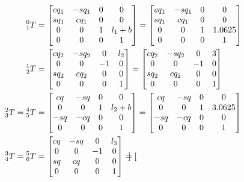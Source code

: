 \documentclass{article}
\begin{document}
\begin{align*}
  \prescript{0}{1}T &= \begin{bmatrix}
    cq_1 & -sq_1 & 0 & 0 \\
    sq_1 & cq_1 & 0 & 0 \\
    0 & 0 & 1 & l_1 + b \\
    0 & 0 & 0 & 1
  \end{bmatrix} = \begin{bmatrix}
    cq_1 & -sq_1 & 0 & 0 \\
    sq_1 & cq_1 & 0 & 0 \\
    0 & 0 & 1 & 1.0625 \\
    0 & 0 & 0 & 1
  \end{bmatrix} \\
  \prescript{1}{2}T &= \begin{bmatrix}
    cq_2 & -sq_2 & 0 & l_2 \\
    0 & 0 & -1 & 0 \\
    sq_2 & cq_2 & 0 & 0 \\
    0 & 0 & 0 & 1
  \end{bmatrix} = \begin{bmatrix}
    cq_2 & -sq_2 & 0 & 3 \\
    0 & 0 & -1 & 0 \\
    sq_2 & cq_2 & 0 & 0 \\
    0 & 0 & 0 & 1
  \end{bmatrix} \\
  \prescript{2}{3}T = \prescript{4}{5}T &= \begin{bmatrix}
    cq & -sq & 0 & 0 \\
    0 & 0 & 1 & l_2 + b \\
    -sq & -cq & 0 & 0 \\
    0 & 0 & 0 & 1
  \end{bmatrix} = \begin{bmatrix}
    cq & -sq & 0 & 0 \\
    0 & 0 & 1 & 3.0625 \\
    -sq & -cq & 0 & 0 \\
    0 & 0 & 0 & 1
  \end{bmatrix} \\
  \prescript{3}{4}T = \prescript{5}{6}T &= \begin{bmatrix}
    cq & -sq & 0 & l_3 \\
    0 & 0 & -1 & 0 \\
    sq & cq & 0 & 0 \\
    0 & 0 & 0 & 1
  \end{bmatrix} = \begin{bmatrix}

\end{bmatrix}
\end{align*}
\end{document}
